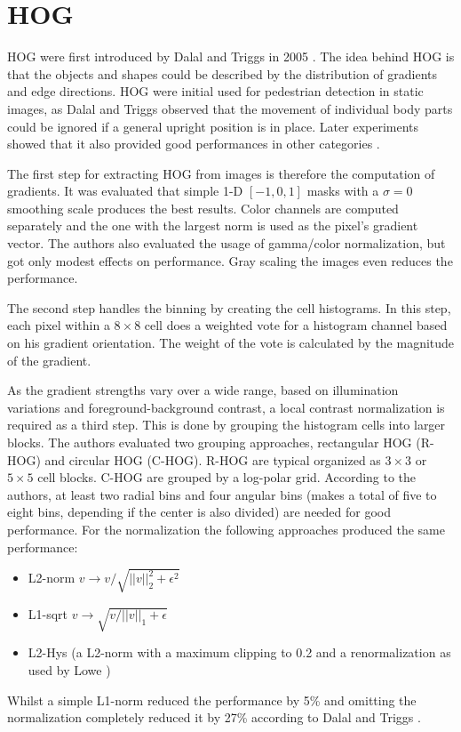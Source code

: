 \section{\acf{HOG}}
\label{sec:hog}

\ac{HOG} were first introduced by Dalal and Triggs in 2005 \cite{Dalal2005}. The idea behind \ac{HOG} is that the objects and shapes could be described by the distribution of gradients and edge directions. \ac{HOG} were initial used for pedestrian detection in static images, as Dalal and Triggs observed that the movement of individual body parts could be ignored if a general upright position is in place. Later experiments showed that it also provided good performances in other categories \cite{Malisiewicz2011}.

The first step for extracting \ac{HOG} from images is therefore the computation of gradients. It was evaluated that simple 1-D $[-1, 0, 1]$ masks with a $\sigma = 0$ smoothing scale produces the best results. Color channels are computed separately and the one with the largest norm is used as the pixel's gradient vector. The authors also evaluated the usage of gamma/color normalization, but got only modest effects on performance. Gray scaling the images even reduces the performance.

The second step handles the binning by creating the cell histograms. In this step, each pixel within a $8 \times 8$ cell does a weighted vote for a histogram channel based on his gradient orientation. The weight of the vote is calculated by the magnitude of the gradient.

As the gradient strengths vary over a wide range, based on illumination variations and foreground-background contrast, a local contrast normalization is required as a third step. This is done by grouping the histogram cells into larger blocks. The authors evaluated two grouping approaches, rectangular HOG (\acs{R-HOG}) and circular HOG (\acs{C-HOG}). \acs{R-HOG} are typical organized as $3\times3$ or $5\times5$ cell blocks. \acs{C-HOG} are grouped by a log-polar grid. According to the authors, at least two radial bins and four angular bins (makes a total of five to eight bins, depending if the center is also divided) are needed for good performance.
For the normalization the following approaches produced the same performance:
\begin{itemize}
	\item L2-norm $v \rightarrow v / \sqrt{||v||_2^2 + \epsilon^2}$
	\item L1-sqrt $v \rightarrow \sqrt{v / ||v||_1 + \epsilon}$
	\item L2-Hys (a L2-norm with a maximum clipping to 0.2 and a renormalization as used by Lowe \cite{Lowe2004})%
\end{itemize}
Whilst a simple L1-norm reduced the performance by 5\% and omitting the normalization completely reduced it by 27\% according to Dalal and Triggs \cite{Dalal2005}.

